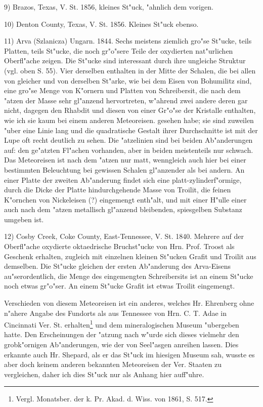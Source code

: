 \documentclass[a4paper, 11pt, oneside]{article}
\begin{document}
9) Brazos, Texas, V. St. 1856, kleines St"uck, "ahnlich dem vorigen.

10) Denton County, Texas, V. St. 1856. Kleines St"uck ebenso.

11) Arva (Szlanicza) Ungarn. 1844. Sechs meistens ziemlich gro"se St"ucke, teils Platten, teils St"ucke, die noch gr"o"sere Teile der oxydierten nat"urlichen Oberfl"ache zeigen. Die St"ucke sind interessant durch ihre ungleiche Struktur (vgl. oben S. 55). Vier derselben enthalten in der Mitte der Schalen, die bei allen von gleicher und von derselben St"arke, wie bei dem Eisen von Bohumilitz sind, eine gro"se Menge von K"ornern und Platten von Schreibersit, die nach dem "atzen der Masse sehr gl"anzend hervortreten, w"ahrend zwei andere deren gar nicht, dagegen den Rhabdit und diesen von einer Gr"o"se der Kristalle enthalten, wie ich sie kaum bei einem anderen Meteoreisen. gesehen habe; sie sind zuweilen "uber eine Linie lang und die quadratische Gestalt ihrer Durchschnitte ist mit der Lupe oft recht deutlich zu sehen. Die "atzelinien sind bei beiden Ab"anderungen auf: den ge"atzten Fl"achen vorhanden, aber in beiden meistenteils nur schwach. Das Meteoreisen ist nach dem "atzen nur matt, wenngleich auch hier bei einer bestimmten Beleuchtung bei gewissen Schalen gl"anzender als bei andern. An einer Platte der zweiten Ab"anderung findet sich eine platt-zylinderf"ormige, durch die Dicke der Platte hindurchgehende Masse von Troilit, die feinen K"ornchen von Nickeleisen (?) eingemengt enth"alt, und mit einer H"ulle einer auch nach dem "atzen metallisch gl"anzend bleibenden, spiesgelben Substanz umgeben ist.

12) Cosby Creek, Coke County, East-Tennessee, V. St. 1840. Mehrere auf der Oberfl"ache oxydierte oktaedrische Bruchst"ucke von Hrn. Prof. Troost als Geschenk erhalten, zugleich mit einzelnen kleinen St"ucken Grafit und Troilit aus demselben. Die St"ucke gleichen der ersten Ab"anderung des Arva-Eisens au"serordentlich, die Menge des eingemengten Schreibersits ist an einem St"ucke noch etwas gr"o"ser. An einem St"ucke Grafit ist etwas Troilit eingemengt.

Verschieden von diesem Meteoreisen ist ein anderes, welches Hr. Ehrenberg ohne n"ahere Angabe des Fundorts als aus Tennessee von Hrn. C. T. Adae in Cincinnati Ver. St. erhalten\footnote{Vergl. Monatsber. der k. Pr. Akad. d. Wiss. von 1861, S. 517.} und dem mineralogischen Museum "ubergeben hatte. Den Erscheinungen der "atzung nach w"urde sich dieses vielmehr den grobk"ornigen Ab"anderungen, wie der von Seel"asgen anreihen lassen. Dies erkannte auch Hr. Shepard, als er das St"uck im hiesigen Museum sah, wusste es aber doch keinem anderen bekannten Meteoreisen der Ver. Staaten zu vergleichen, daher ich dies St"uck nur als Anhang hier auff"uhre.
\end{document}
